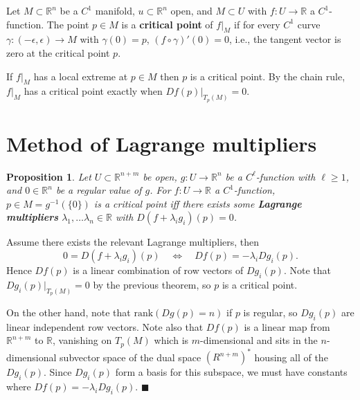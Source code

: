 \documentclass[letter-paper]{tufte-book}
\newtheorem{proposition}[theorem]{\color{pastel-blue}Proposition}
\newenvironment{proof}[1][Proof]{\begin{trivlist}
\item[\hskip \labelsep {\bfseries #1}]}{\end{trivlist}}
\newcommand{\qed}{\hfill$\blacksquare$}
\begin{document}
Let $M \subset \mathbb{R}^n$ be a $C^1$ manifold, $u \subset \mathbb{R}^n$ open,
and $M \subset U$ with $f : U \to \mathbb{R}$ a $C^1$-function. The point $p \in
M$ is a \textbf{critical point} of $f|_M$ if for every $C^1$ curve $\gamma :
(-\epsilon, \epsilon) \to M$ with $\gamma(0) = p$, $(f \circ \gamma)'(0) = 0$,
i.e., the tangent vector is zero at the critical point $p$.

If $f|_M$ has a local extreme at $p \in M$ then $p$ is a critical point. By the
chain rule, $f|_M$ has a critical point exactly when $Df(p)|_{T_p(M)} = 0$.


\section{Method of Lagrange multipliers}

\begin{proposition}
  Let $U \subset \mathbb{R}^{n+m}$ be open, $g : U \to \mathbb{R}^n$ be a
  $C^\ell$-function with $\ell \geq 1$, and $0 \in \mathbb{R}^n$ be a regular
  value of $g$. For $f : U \to \mathbb{R}$ a $C^1$-function, $p \in M =
  g^{-1}(\{0\})$ is a critical point iff there exists some \textbf{Lagrange
  multipliers} $\lambda_1, \ldots \lambda_n \in \mathbb{R}$ with $D(f + \lambda_i
  g_i)(p) = 0$.
\end{proposition}

\begin{proof}
  Assume there exists the relevant Lagrange multipliers, then
  \begin{equation*}
    0 = D(f + \lambda_i g_i)(p) \quad \Leftrightarrow \quad Df(p) = -\lambda_i Dg_i(p).
  \end{equation*}
  Hence $Df(p)$ is a linear combination of row vectors of $Dg_i(p)$. Note that
  $Dg_i(p)|_{T_p(M)} = 0$ by the previous theorem, so $p$ is a critical point.
  
  On the other hand, note that $\mbox{rank}(Dg(p) = n)$ if $p$ is regular, so
  $Dg_i(p)$ are linear independent row vectors. Note also that $Df(p)$ is a
  linear map from $\mathbb{R}^{n+m}$ to $\mathbb{R}$, vanishing on $T_p(M)$
  which is $m$-dimensional and sits in the $n$-dimensional subvector space of
  the dual space $(R^{n+m})^*$ housing all of the $Dg_i(p)$. Since $Dg_i(p)$
  form a basis for this subspace, we must have constants where $Df(p) =
  -\lambda_i Dg_i(p)$. \qed
\end{proof}
\end{document}
